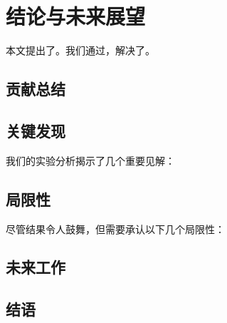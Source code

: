 
\section{结论与未来展望}
\label{sec:conclusion}

本文提出了。我们通过，解决了。

\subsection{贡献总结}



\subsection{关键发现}

我们的实验分析揭示了几个重要见解：


\subsection{局限性}

尽管结果令人鼓舞，但需要承认以下几个局限性：



\subsection{未来工作}





\subsection{结语}
